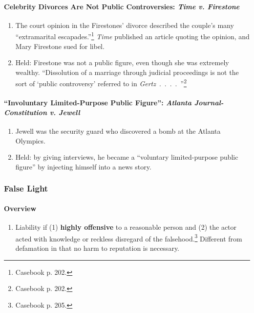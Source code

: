 \paragraph{Celebrity Divorces Are Not Public Controversies: \emph{Time v.  
Firestone}}

\begin{enumerate}
    \item The court opinion in the Firestones' divorce described the couple's 
    many ``extramarital escapades.''\footnote{Casebook p. 202.} \emph{Time} 
    published an article quoting the opinion, and Mary Firestone sued for libel.
    \item Held: Firestone was not a public figure, even though she was extremely 
    wealthy. ``Dissolution of a marriage through judicial proceedings is not the 
    sort of `public controversy' referred to in 
    \emph{Gertz}~.~.~.~.~''\footnote{Casebook p. 202.}
\end{enumerate}

\paragraph{``Involuntary Limited-Purpose Public Figure'': \emph{Atlanta 
Journal-Constitution v. Jewell}}

\begin{enumerate}
    \item Jewell was the security guard who discovered a bomb at the Atlanta 
    Olympics.
    \item Held: by giving interviews, he became a ``voluntary limited-purpose 
    public figure'' by injecting himself into a news story.
\end{enumerate}

\subsubsection{False Light}

\paragraph{Overview}

\begin{enumerate}
    \item Liability if (1) \textbf{highly offensive} to a reasonable person and 
    (2) the actor acted with knowledge or reckless disregard of the 
    falsehood.\footnote{Casebook p. 205.} Different from defamation in that no 
    harm to reputation is necessary.
\end{enumerate}


